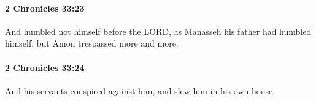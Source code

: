 		\paragraph{2 Chronicles 33:23} %
			\label{2CHRONICLES-33-23}

			And humbled not himself before the LORD, as Manasseh his father had humbled himself; but Amon trespassed more and more.


		\paragraph{2 Chronicles 33:24} %
			\label{2CHRONICLES-33-24}

			And his servants conspired against him, and slew him in his own house.


